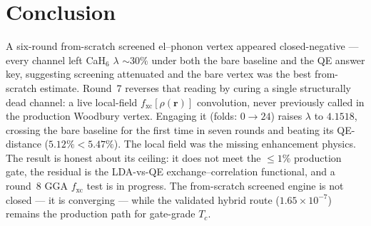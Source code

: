 \documentclass[11pt,a4paper]{article}
\begin{document}
\section{Conclusion}
\label{sec:conclusion}

A six-round from-scratch screened el--phonon vertex appeared closed-negative
--- every channel left CaH$_6$ $\lambda$ $\sim\!30\%$ under both the bare
baseline and the QE answer key, suggesting screening attenuated and the bare
vertex was the best from-scratch estimate. Round~7 reverses that reading by
curing a single structurally dead channel: a live local-field
$f_{\mathrm{xc}}[\rho(\mathbf{r})]$ convolution, never previously called in
the production Woodbury vertex. Engaging it (folds: $0 \to 24$) raises
$\lambda$ to $4.1518$, crossing the bare baseline for the first time in seven
rounds and beating its QE-distance ($5.12\% < 5.47\%$). The local field was
the missing enhancement physics. The result is honest about its ceiling: it
does not meet the $\le\!1\%$ production gate, the residual is the LDA-vs-QE
exchange--correlation functional, and a round~8 GGA $f_{\mathrm{xc}}$ test is
in progress. The from-scratch screened engine is not closed --- it is
converging --- while the validated hybrid route ($1.65\times10^{-7}$) remains
the production path for gate-grade $T_c$.


\nocite{*}

\end{document}
